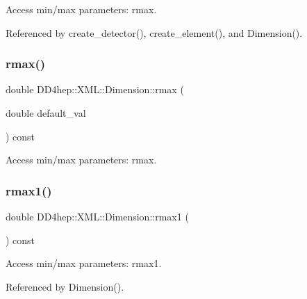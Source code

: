 Access min/max parameters\+: rmax. 



Referenced by create\+\_\+detector(), create\+\_\+element(), and Dimension().

\hypertarget{struct_d_d4hep_1_1_x_m_l_1_1_dimension_ac458880df7de7d4a9876b1c20f398eb8}{}\label{struct_d_d4hep_1_1_x_m_l_1_1_dimension_ac458880df7de7d4a9876b1c20f398eb8} 
\subsubsection{\texorpdfstring{rmax()}{rmax()}\hspace{0.1cm}{\footnotesize\ttfamily [2/2]}}
{\footnotesize\ttfamily double D\+D4hep\+::\+X\+M\+L\+::\+Dimension\+::rmax (\begin{DoxyParamCaption}\item[{double}]{default\+\_\+val }\end{DoxyParamCaption}) const}



Access min/max parameters\+: rmax. 

\hypertarget{struct_d_d4hep_1_1_x_m_l_1_1_dimension_ada815f20fb0045d499b91e646ceca415}{}\label{struct_d_d4hep_1_1_x_m_l_1_1_dimension_ada815f20fb0045d499b91e646ceca415} 
\subsubsection{\texorpdfstring{rmax1()}{rmax1()}\hspace{0.1cm}{\footnotesize\ttfamily [1/2]}}
{\footnotesize\ttfamily double D\+D4hep\+::\+X\+M\+L\+::\+Dimension\+::rmax1 (\begin{DoxyParamCaption}{ }\end{DoxyParamCaption}) const}



Access min/max parameters\+: rmax1. 



Referenced by Dimension().

\hypertarget{struct_d_d4hep_1_1_x_m_l_1_1_dimension_a7cc26c67a212d9aeaaf0b1d10531c0c7}{}\label{struct_d_d4hep_1_1_x_m_l_1_1_dimension_a7cc26c67a212d9aeaaf0b1d10531c0c7} 
